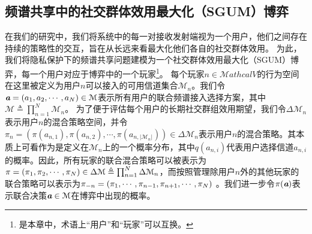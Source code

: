 \subsection{频谱共享中的社交群体效用最大化（SGUM）博弈}\label{sec:SGUM}
在我们的研究中，我们将系统中的每一对接收发射端视为一个用户，他们之间存在持续的策略性的交互，旨在从长远来看最大化他们各自的社交群体效用。
为此，我们将隐私保护下的频谱共享问题建模为一个社交群体效用最大化（SGUM）博弈，每一个用户对应于博弈中的一个玩家\footnote{是本章中，术语上“用户”和“玩家”可以互换。}。
每个玩家$n\in\mathcal{M}athcal{V}$的行为空间在这里被定义为用户$n$可以接入的可用信道集合$\mathcal{M}_n$。我们令$\emph{\textbf{a}}=(a_1,a_2,\cdots,a_N)\in\mathcal{M}$表示所有用户的联合频谱接入选择方案，其中$\mathcal{M}\triangleq\prod_{n=1}^N\mathcal{M}_n$。
为了便于评估每个用户的长期社交群组效用期望，我们令$\Delta\mathcal{M}_n$表示用户$n$的混合策略空间，并令$\pi_n=\left(\pi(a_{n,1}),\pi(a_{n,2}),\cdots,\pi(a_{n,|\mathcal{M}_n|})\right)\in\Delta\mathcal{M}_n$表示用户$n$的混合策略。其本质上可看作为是定义在$\mathcal{M}_n$上的一个概率分布，其中$q(a_{n,i})$代表用户选择信道$a_{n,i}$的概率。因此，所有玩家的联合混合策略可以被表示为$\pi=(\pi_1,\pi_2,\cdots,\pi_N)\in\Delta\mathcal{M}\triangleq\prod_{n=1}^N\Delta\mathcal{M}_n$，而按照管理除用户$n$外的其他玩家的联合策略可以表示为$\pi_{-n}=(\pi_1,\cdots,\pi_{n-1},\pi_{n+1},\cdots,\pi_N)$ 。我们进一步令$\pi(\emph{\textbf{a}})$表示联合决策$\emph{\textbf{a}}\in\mathcal{M}$在博弈中出现的概率。


